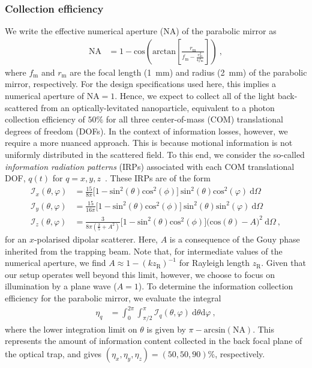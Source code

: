 \documentclass[%
 reprint,
 amsmath,amssymb,
 aps,
pra,
]{revtex4-2}
\begin{document}
\subsubsection{Collection efficiency}
\noindent We write the effective numerical aperture (NA) of the parabolic mirror as 
\begin{align}
    \mathrm{NA} &= 1 - \mathrm{cos}\left(\mathrm{arctan}\left[\frac{r_{\mathrm{m}}}{f_{\mathrm{m}} - \frac{r_{\mathrm{m}}^{2}}{4f_{\mathrm{m}}}}\right]\right) ~ , 
\end{align}
where $f_{\mathrm{m}}$ and $r_{\mathrm{m}}$ are the focal length (1~mm) and radius (2~mm) of the parabolic mirror, respectively. For the design specifications used here, this implies a numerical aperture of $\mathrm{NA}= 1$. Hence, we expect to collect all of the light back-scattered from an optically-levitated nanoparticle, equivalent to a photon collection efficiency of $50\%$ for all three center-of-mass (COM) translational degrees of freedom (DOFs). In the context of information losses, however, we require a more nuanced approach. This is because motional information is not uniformly distributed in the scattered field. To this end, we consider the so-called \textsl{information radiation patterns} (IRPs) associated with each COM translational DOF, $q(t)$ for $q = x,y,z$~\cite{tebbenjohanns_optimal_2019, maurer_quantum_2023}. These IRPs are of the form
\begin{align}
    \mathcal{I}_{x}(\theta, \varphi) &= \frac{15}{8\pi}\Big[1-\mathrm{sin}^{2}(\theta)\mathrm{cos}^{2}(\phi)\Big]~\mathrm{sin}^{2}(\theta)\mathrm{cos}^{2}(\varphi)~\mathrm{d}\Omega \\
    \mathcal{I}_{y}(\theta, \varphi) &= \frac{15}{16\pi}\Big[1-\mathrm{sin}^{2}(\theta)\mathrm{cos}^{2}(\phi)\Big]~\mathrm{sin}^{2}(\theta)\mathrm{sin}^{2}(\varphi)~\mathrm{d}\Omega \\
    \mathcal{I}_{z}(\theta, \varphi) &= \frac{3}{8\pi(\frac{2}{5}+A^{2})}\Big[1-\mathrm{sin}^{2}(\theta)\mathrm{cos}^{2}(\phi)\Big]\Big(\mathrm{cos}(\theta)-A\Big)^{2}~\mathrm{d}\Omega ~ ,
\end{align}
for an $x$-polarised dipolar scatterer. Here, $A$ is a consequence of the Gouy phase inherited from the trapping beam. Note that, for intermediate values of the numerical aperture, we find $A \approx 1-(kz_{\mathrm{R}})^{-1}$ for Rayleigh length $z_{\mathrm{R}}$. Given that our setup operates well beyond this limit, however, we choose to focus on illumination by a plane wave ($A=1$). To determine the information collection efficiency for the parabolic mirror, we evaluate the integral
\begin{align}
    \eta_{q} &= \int^{2\pi}_{0}\int^{\pi}_{\pi/2}  \mathcal{I}_{q}(\theta, \varphi)~\mathrm{d}\theta\mathrm{d}\varphi ~ ,
\end{align}
where the lower integration limit on $\theta$ is given by $\pi - \mathrm{arcsin}(\mathrm{NA})$. This represents the amount of information content collected in the back focal plane of the optical trap, and gives $(\eta_{x}, \eta_{y}, \eta_{z}) = (50, 50, 90)\%$, respectively.
\end{document}
